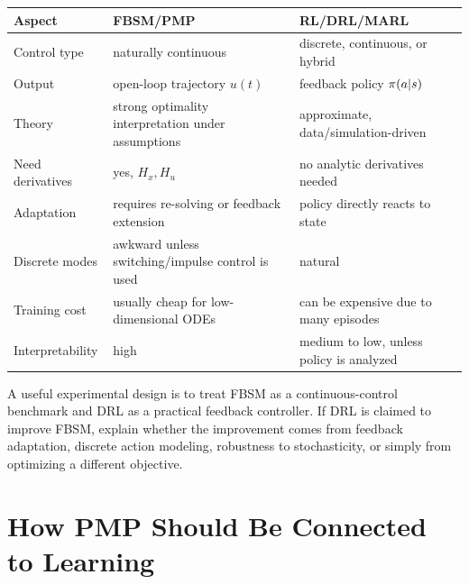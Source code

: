 \documentclass[11pt,a4paper]{article}
\begin{document}
\begin{longtable}{p{}p{}p{}}
\toprule
Aspect & FBSM/PMP & RL/DRL/MARL \\
\midrule
Control type & naturally continuous & discrete, continuous, or hybrid \\
Output & open-loop trajectory $u(t)$ & feedback policy $\pi(a|s)$ \\
Theory & strong optimality interpretation under assumptions & approximate, data/simulation-driven \\
Need derivatives & yes, $H_x,H_u$ & no analytic derivatives needed \\
Adaptation & requires re-solving or feedback extension & policy directly reacts to state \\
Discrete modes & awkward unless switching/impulse control is used & natural \\
Training cost & usually cheap for low-dimensional ODEs & can be expensive due to many episodes \\
Interpretability & high & medium to low, unless policy is analyzed \\
\bottomrule
\end{longtable}

A useful experimental design is to treat FBSM as a continuous-control benchmark and DRL as a practical feedback controller. If DRL is claimed to improve FBSM, explain whether the improvement comes from feedback adaptation, discrete action modeling, robustness to stochasticity, or simply from optimizing a different objective.

\section{How PMP Should Be Connected to Learning}
\end{document}
